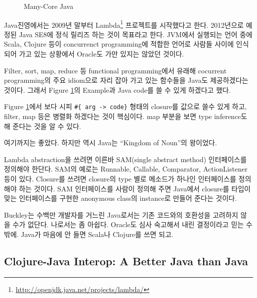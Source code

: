 \documentclass[11pt]{article}
\begin{document}
\begin{figure}[t]
    \begin{Frame}
        \begin{center}
        \end{center}
    \end{Frame}
    \caption{Many-Core Java}
    \label{lambda}
\end{figure}

Java진영에서는 2009년 
말부터 Lambda\footnote{\url{http://openjdk.java.net/projects/lambda/}}
프로젝트를 시작했다고 한다. 
2012년으로 예정된 Java SE8에 정식 릴리즈 하는 것이 목표라고 한다.
JVM에서 실행되는 언어 중에 Scala, Clojure 등이 concurrenct programming에 
적합한 언어로 사람들 사이에 인식되어 가고 있는 상황에서 Oracle도 가만 있지는 
않았던 것이다.

Filter, sort, map, reduce 등 functional programming에서 유래해 cocurrent
programming의 주요 idiom으로 자리 잡아 가고 있는 함수들을 Java도
제공하겠다는 것이다. 그래서 Figure \ref{lambda}의 Example과 Java code를 쓸
수 있게 하겠다고 했다.
 
Figure \ref{lambda}에서 보다 시피 \verb=#{ arg -> code}= 형태의 closure를 
값으로 쓸수 있게 하고, filter, map 등은 병렬화 하겠다는 것이 핵심이다. 
map 부분을 보면 type inference도 해 준다는 것을 알 수 있다.
 
여기까지는 좋았다. 하지만 역시 Java는 ``Kingdom of Noun''\cite{yegge}의 
왕이었다.
 
Lambda abstraction을 쓰려면 이른바 SAM(single abstract method)
인터페이스를 정의해야 한단다.  SAM의 예로는 Runnable, Callable,
Comparator, ActionListener 등이 있다. Closure를 쓰려면 closure의 type 별로
메소드가 하나인 인터페이스를 정의해야 하는 것이다. SAM 인터페이스를 사람이
정의해 주면 Java에서 closure를 타입이 맞는 인터페이스를 구현한 anonymous 
class의 instance로 만들어 준다는 것이다.
 
Buckley는 수백만 개발자를 거느린 Java로서는 기존 코드와의 호환성을 고려하지 
않을 수가 없단다. 나로서는 좀 아쉽다. Oracle도 심사 숙고해서 내린 결정이라고 
믿는 수 밖에. Java가 마음에 안 들면 Scala나 Clojure를 쓰면 되고.

\subsection{Clojure-Java Interop: A Better Java than Java}

\end{document}
